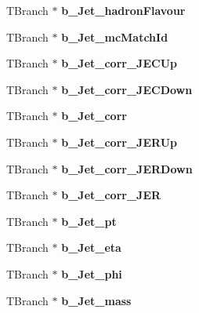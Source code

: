 \begin{DoxyCompactItemize}
T\+Branch $\ast$ {\bfseries b\+\_\+\+Jet\+\_\+hadron\+Flavour}
\item 
\hypertarget{classMiniTree_adbd3595b2e89b79fdcf211b09ae98902}{}\label{classMiniTree_adbd3595b2e89b79fdcf211b09ae98902} 
T\+Branch $\ast$ {\bfseries b\+\_\+\+Jet\+\_\+mc\+Match\+Id}
\item 
\hypertarget{classMiniTree_a46e163bd1ff40245bacfb74e63281f75}{}\label{classMiniTree_a46e163bd1ff40245bacfb74e63281f75} 
T\+Branch $\ast$ {\bfseries b\+\_\+\+Jet\+\_\+corr\+\_\+\+J\+E\+C\+Up}
\item 
\hypertarget{classMiniTree_a6e6c1a63c1056fa4cc1b2036003232d0}{}\label{classMiniTree_a6e6c1a63c1056fa4cc1b2036003232d0} 
T\+Branch $\ast$ {\bfseries b\+\_\+\+Jet\+\_\+corr\+\_\+\+J\+E\+C\+Down}
\item 
\hypertarget{classMiniTree_af1c0ef36e628fdd4817c9c513f353e35}{}\label{classMiniTree_af1c0ef36e628fdd4817c9c513f353e35} 
T\+Branch $\ast$ {\bfseries b\+\_\+\+Jet\+\_\+corr}
\item 
\hypertarget{classMiniTree_af487028ee312d5bfd317fa4297ea4291}{}\label{classMiniTree_af487028ee312d5bfd317fa4297ea4291} 
T\+Branch $\ast$ {\bfseries b\+\_\+\+Jet\+\_\+corr\+\_\+\+J\+E\+R\+Up}
\item 
\hypertarget{classMiniTree_a2b84fd4da02667dc30c8abbcbf447150}{}\label{classMiniTree_a2b84fd4da02667dc30c8abbcbf447150} 
T\+Branch $\ast$ {\bfseries b\+\_\+\+Jet\+\_\+corr\+\_\+\+J\+E\+R\+Down}
\item 
\hypertarget{classMiniTree_a4c7829f50954b4f8659ddc93d5918240}{}\label{classMiniTree_a4c7829f50954b4f8659ddc93d5918240} 
T\+Branch $\ast$ {\bfseries b\+\_\+\+Jet\+\_\+corr\+\_\+\+J\+ER}
\item 
\hypertarget{classMiniTree_ac9c23fbca2e25a539ef93ba70beec144}{}\label{classMiniTree_ac9c23fbca2e25a539ef93ba70beec144} 
T\+Branch $\ast$ {\bfseries b\+\_\+\+Jet\+\_\+pt}
\item 
\hypertarget{classMiniTree_a92ed68c2ab25f1e4bb719c39666cab50}{}\label{classMiniTree_a92ed68c2ab25f1e4bb719c39666cab50} 
T\+Branch $\ast$ {\bfseries b\+\_\+\+Jet\+\_\+eta}
\item 
\hypertarget{classMiniTree_a26432d5c1de67c4daad8fc26d3820b54}{}\label{classMiniTree_a26432d5c1de67c4daad8fc26d3820b54} 
T\+Branch $\ast$ {\bfseries b\+\_\+\+Jet\+\_\+phi}
\item 
\hypertarget{classMiniTree_a7ad32b57053bc61f3cbd1fdcd1f7100e}{}\label{classMiniTree_a7ad32b57053bc61f3cbd1fdcd1f7100e} 
T\+Branch $\ast$ {\bfseries b\+\_\+\+Jet\+\_\+mass}
\item 

\end{DoxyCompactItemize}
